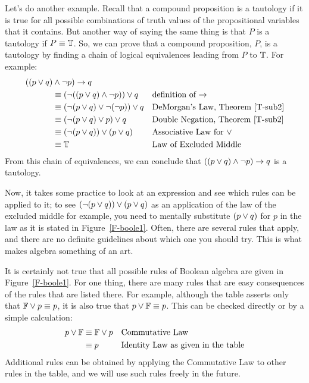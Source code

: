 Let's do another example.  Recall that a compound proposition is a
tautology if it is true for all possible combinations of truth values
of the propositional variables that it contains.  But another way
of saying the same thing is that $P$ is a tautology if $P\equiv\mathbb{T}$.
So, we can prove that a compound proposition, $P$, is a tautology by
finding a chain of logical equivalences leading from $P$ to $\mathbb{T}$.
For example:
\begin{align*}
   ((p\vee q) &\wedge \lnot p)\rightarrow q &&\\
      &\equiv (\lnot((p\vee q)\wedge\lnot p))\vee q &&\text{definition of $\rightarrow$}\\
      &\equiv (\lnot(p\vee q) \vee \lnot (\lnot p))\vee q                     &&\text{DeMorgan's Law, Theorem \ref{T-sub2}}\\
      &\equiv (\lnot(p\vee q) \vee p)\vee q                                 &&\text{Double Negation, Theorem \ref{T-sub2}}\\
      &\equiv (\lnot (p\vee q)) \vee (p\vee q)                              &&\text{Associative Law for $\vee$}\\
      &\equiv \mathbb{T}                                                        &&\text{Law of Excluded Middle}\\
\end{align*}
From this chain of equivalences, we can conclude that $((p\vee q) \wedge \lnot p)\rightarrow q$
is a tautology.

Now, it takes some practice to look at an expression and see which
rules can be applied to it; to see $(\lnot (p\vee q)) \vee (p\vee q)$
as an application of the law of the excluded middle for example,
you need to mentally substitute $(p\vee q)$ for $p$ in the law as it is stated
in Figure~\ref{F-boole1}.  Often, there are several rules that
apply, and there are no definite guidelines about which one you
should try.  This is what makes algebra something of an art.


\medbreak

It is certainly not true that all possible rules of Boolean algebra are given
in Figure~\ref{F-boole1}.  For one thing, there are many rules that are easy
consequences of the rules that are listed there.  For example, although the
table asserts only that $\mathbb{F}\vee p\equiv p$, it is also true that
$p\vee\mathbb{F}\equiv p$.  This can be checked directly or by a simple calculation:
\begin{align*}
p\vee\mathbb{F} &\equiv \mathbb{F}\vee p &&\text{Commutative Law}\\
        &\equiv p        &&\text{Identity Law as given in the table}\\
\end{align*}
Additional rules can be obtained by applying the Commutative Law to other
rules in the table, and we will use such rules freely in the future.


